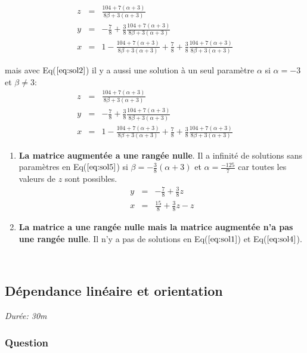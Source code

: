 \[
\begin{eqnarray}
   z & =&  \frac{104 + 7(\alpha +3)}{8\beta + 3(\alpha+3)} \\
   y & =&  -\frac{7}{8}+\frac{3}{8}\frac{104 + 7(\alpha +3)}{8\beta + 3(\alpha+3)} \\
x & =&  1 - \frac{104 + 7(\alpha +3)}{8\beta + 3(\alpha+3)} +\frac{7}{8}+\frac{3}{8}\frac{104 + 7(\alpha +3)}{8\beta + 3(\alpha+3)}
   \end{eqnarray}
\]

mais avec Eq(\(\ref{eq:sol2}\)) il y a aussi une solution à un seul
paramètre \(\alpha\) si \(\alpha = -3\) et \(\beta \ne 3\): \[
\begin{eqnarray}
   z & = & \frac{104 + 7(\alpha +3)}{8\beta + 3(\alpha+3)} \\
   y & = & -\frac{7}{8}+\frac{3}{8}\frac{104 + 7(\alpha +3)}{8\beta + 3(\alpha+3)} \\
x & = & 1 - \frac{104 + 7(\alpha +3)}{8\beta + 3(\alpha+3)} +\frac{7}{8}+\frac{3}{8}\frac{104 + 7(\alpha +3)}{8\beta + 3(\alpha+3)}
   \end{eqnarray}
\]

\begin{enumerate}
\def\labelenumi{\arabic{enumi}.}
\setcounter{enumi}{1}
\item
  \textbf{La matrice augmentée a une rangée nulle}. Il a infinité de
  solutions sans paramètres en Eq(\(\ref{eq:sol5}\)) si
  \(\beta = -\frac{3}{8}(\alpha+3)\) et \(\alpha = \frac{-125}{7}\) car
  toutes les valeurs de \(z\) sont possibles. \[
  \begin{eqnarray}
  y & = & -\frac{7}{8}+\frac{3}{8}z \\
  x & = & \frac{15}{8}+\frac{3}{8}z - z
  \end{eqnarray}
  \]
\item
  \textbf{La matrice a une rangée nulle mais la matrice augmentée n'a
  pas une rangée nulle}. Il n'y a pas de solutions en
  Eq(\(\ref{eq:sol1}\)) et Eq(\(\ref{eq:sol4}\)).
\end{enumerate}

​

\subsection{Dépendance linéaire et orientation}

\emph{Durée: 30m}

\subsubsection{Question}

